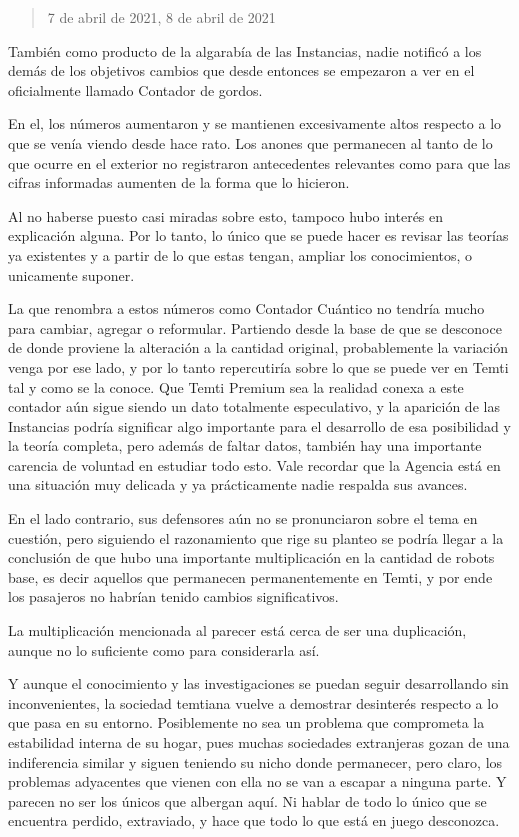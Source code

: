\documentclass[
  spanish,
]{book}
\begin{document}
\begin{quote}
7 de abril de 2021, 8 de abril de 2021
\end{quote}

También como producto de la algarabía de las Instancias, nadie notificó a los demás de los objetivos cambios que desde entonces se empezaron a ver en el oficialmente llamado Contador de gordos.

En el, los números aumentaron y se mantienen excesivamente altos respecto a lo que se venía viendo desde hace rato. Los anones que permanecen al tanto de lo que ocurre en el exterior no registraron antecedentes relevantes como para que las cifras informadas aumenten de la forma que lo hicieron.

Al no haberse puesto casi miradas sobre esto, tampoco hubo interés en explicación alguna. Por lo tanto, lo único que se puede hacer es revisar las teorías ya existentes y a partir de lo que estas tengan, ampliar los conocimientos, o unicamente suponer.

La que renombra a estos números como Contador Cuántico no tendría mucho para cambiar, agregar o reformular. Partiendo desde la base de que se desconoce de donde proviene la alteración a la cantidad original, probablemente la variación venga por ese lado, y por lo tanto repercutiría sobre lo que se puede ver en Temti tal y como se la conoce. Que Temti Premium sea la realidad conexa a este contador aún sigue siendo un dato totalmente especulativo, y la aparición de las Instancias podría significar algo importante para el desarrollo de esa posibilidad y la teoría completa, pero además de faltar datos, también hay una importante carencia de voluntad en estudiar todo esto. Vale recordar que la Agencia está en una situación muy delicada y ya prácticamente nadie respalda sus avances.

En el lado contrario, sus defensores aún no se pronunciaron sobre el tema en cuestión, pero siguiendo el razonamiento que rige su planteo se podría llegar a la conclusión de que hubo una importante multiplicación en la cantidad de robots base, es decir aquellos que permanecen permanentemente en Temti, y por ende los pasajeros no habrían tenido cambios significativos.

La multiplicación mencionada al parecer está cerca de ser una duplicación, aunque no lo suficiente como para considerarla así.

Y aunque el conocimiento y las investigaciones se puedan seguir desarrollando sin inconvenientes, la sociedad temtiana vuelve a demostrar desinterés respecto a lo que pasa en su entorno. Posiblemente no sea un problema que comprometa la estabilidad interna de su hogar, pues muchas sociedades extranjeras gozan de una indiferencia similar y siguen teniendo su nicho donde permanecer, pero claro, los problemas adyacentes que vienen con ella no se van a escapar a ninguna parte. Y parecen no ser los únicos que albergan aquí. Ni hablar de todo lo único que se encuentra perdido, extraviado, y hace que todo lo que está en juego desconozca.
\end{document}
